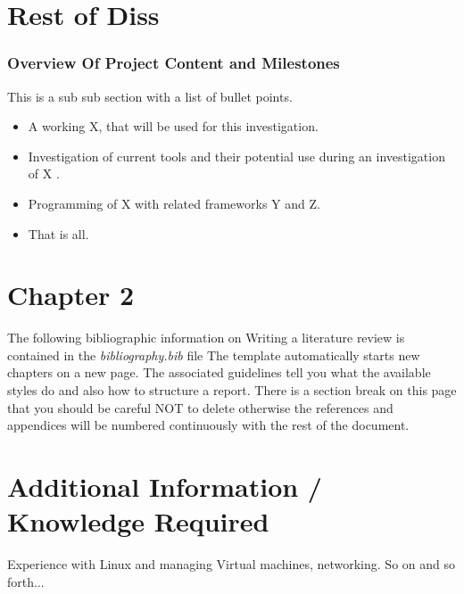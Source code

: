 \documentclass[12pt,a4paper]{article}
\begin{document}
\newpage



\section{Rest of Diss}

\subsubsection{Overview Of Project Content and Milestones}

This is a sub sub section with a list of bullet points.
\begin{itemize}\itemsep0pt
	\item A working X, that will be used for this investigation.
	\item Investigation of current tools and their potential use during an investigation of X .
	\item Programming of X with related frameworks Y and Z.
	\item That is all.
\end{itemize}


\section{Chapter 2}
The following bibliographic information on Writing a literature review is contained in the \emph{bibliography.bib} file 
The template automatically starts new chapters on a new page.  The associated guidelines tell you what the available styles do and also how to structure a report.
There is a section break on this page that you should be careful NOT to delete otherwise the references and appendices will be numbered continuously with the rest of the document.

\section{Additional Information / Knowledge Required}
Experience with Linux and managing Virtual machines, networking.
So on and so forth...




\end{document}
